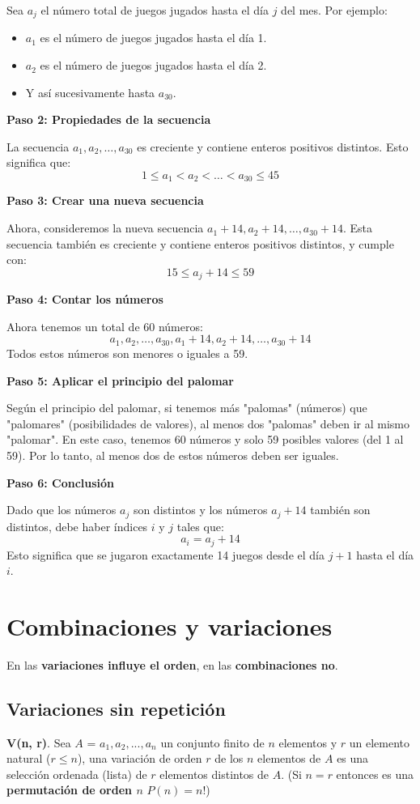 \documentclass{article}
\begin{document}
Sea $ a_j $ el número total de juegos jugados hasta el día $ j $ del mes. Por ejemplo:
\begin{itemize}
    \item $ a_1 $ es el número de juegos jugados hasta el día 1.
    \item $ a_2 $ es el número de juegos jugados hasta el día 2.
    \item Y así sucesivamente hasta $ a_{30} $.
\end{itemize}

\textbf{Paso 2: Propiedades de la secuencia}

La secuencia $ a_1, a_2, \ldots, a_{30} $ es creciente y contiene enteros positivos distintos. Esto significa que:
$$1 \leq a_1 < a_2 < \ldots < a_{30} \leq 45$$

\textbf{Paso 3: Crear una nueva secuencia}

Ahora, consideremos la nueva secuencia $ a_1 + 14, a_2 + 14, \ldots, a_{30} + 14 $. Esta secuencia también es creciente y contiene enteros positivos distintos, y cumple con:
$$15 \leq a_j + 14 \leq 59$$

\textbf{Paso 4: Contar los números}

Ahora tenemos un total de 60 números:
$$a_1, a_2, \ldots, a_{30}, a_1 + 14, a_2 + 14, \ldots, a_{30} + 14$$
Todos estos números son menores o iguales a 59.

\textbf{Paso 5: Aplicar el principio del palomar}

Según el principio del palomar, si tenemos más "palomas" (números) que "palomares" (posibilidades de valores), al menos dos "palomas" deben ir al mismo "palomar". En este caso, tenemos 60 números y solo 59 posibles valores (del 1 al 59). Por lo tanto, al menos dos de estos números deben ser iguales.

\textbf{Paso 6: Conclusión}

Dado que los números $ a_j $ son distintos y los números $ a_j + 14 $ también son distintos, debe haber índices $ i $ y $ j $ tales que:
$$a_i = a_j + 14$$
Esto significa que se jugaron exactamente 14 juegos desde el día $ j + 1 $ hasta el día $ i $.

\section{Combinaciones y variaciones}
En las \textbf{variaciones influye el orden}, en las \textbf{combinaciones no}.
\subsection{Variaciones sin repetición}
\textbf{V(n, r)}. Sea $A$ = {$a_1, a_2, ..., a_n$} un conjunto finito de $n$ elementos y $r$ un elemento natural ($r \leq n$), una variación de orden $r$ de los $n$ elementos de $A$ es una selección ordenada (lista) de $r$ elementos distintos de $A$. (Si $n = r$ entonces es una \textbf{permutación de orden $n$} $P(n) = n!$)
\end{document}
